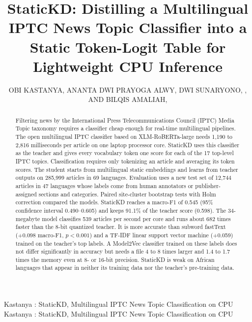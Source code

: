 \documentclass{ieeeaccess}
\begin{document}
\def\theyear{2026}

\title{StaticKD: Distilling a Multilingual IPTC News Topic Classifier into a Static Token-Logit Table for Lightweight CPU Inference}

\author{\uppercase{Obi Kastanya}, \uppercase{Ananta Dwi Prayoga Alwy}, \uppercase{Dwi Sunaryono}, , AND \uppercase{Bilqis Amaliah}, }
\address[1]{Department of Informatics Engineering, Sepuluh Nopember Institute of Technology, Surabaya, Indonesia (e-mail: 6025252015@student.its.ac.id; 6025252007@student.its.ac.id; dwi.syn@its.ac.id; bilqis@if.its.ac.id)}

\markboth
{Kastanya \headeretal: StaticKD, Multilingual IPTC News Topic Classification on CPU}
{Kastanya \headeretal: StaticKD, Multilingual IPTC News Topic Classification on CPU}


\begin{abstract}
Filtering news by the International Press Telecommunications Council (IPTC) Media Topic taxonomy requires a classifier cheap enough for real-time multilingual pipelines. The open multilingual IPTC classifier based on XLM-RoBERTa-large needs 1,190 to 2,816 milliseconds per article on one laptop processor core. StaticKD uses this classifier as the teacher and gives every vocabulary token one score for each of the 17 top-level IPTC topics. Classification requires only tokenizing an article and averaging its token scores. The student starts from multilingual static embeddings and learns from teacher outputs on 285,999 articles in 69 languages. Evaluation uses a new test set of 12,744 articles in 47 languages whose labels come from human annotators or publisher-assigned sections and categories. Paired site-cluster bootstrap tests with Holm correction compared the models. StaticKD reaches a macro-F1 of 0.545 (95\% confidence interval 0.490--0.605) and keeps 91.1\% of the teacher score (0.598). The 34-megabyte model classifies 539 articles per second per core and runs about 682 times faster than the 8-bit quantized teacher. It is more accurate than subword fastText (+0.098 macro-F1, $p<0.001$) and a TF-IDF linear support vector machine (+0.059) trained on the teacher's top labels. A Model2Vec classifier trained on these labels does not differ significantly in accuracy but needs a file 4 to 8 times larger and 1.4 to 1.7 times the memory even at 8- or 16-bit precision. StaticKD is weak on African languages that appear in neither its training data nor the teacher's pre-training data.
\end{abstract}
\end{document}
